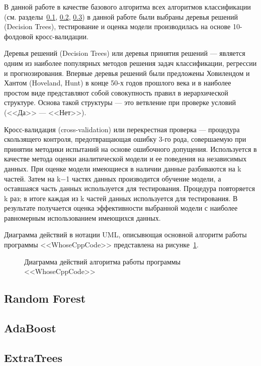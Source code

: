 В данной работе в качестве базового алгоритма всех алгоритмов классификации (см. разделы~\ref{random_forest},
\ref{ada}, \ref{extra}) в данной работе были выбраны деревья решений 
(Decision Trees), тестирование и оценка модели производилась на основе 10-фолдовой кросс-валидации.

Деревья решений (Decision Trees) или деревья принятия решений --- является одним из наиболее популярных
методов решения задач классификации, регрессии и прогнозирования. Впервые деревья решений были предложены Ховилендом и Хантом (Hoveland, Hunt) 
в конце 50-х годов прошлого века и в наиболее простом виде представляют собой совокупность правил в иерархической 
структуре. Основа такой структуры --- это ветвление при проверке условий (<<Да>> --- <<Нет>>).~\cite{data_mining} 

Кросс-валидация (cross-validation) или перекрестная проверка --- 
процедура скользящего контроля, предотвращающая ошибку 3-го рода, совершаемую 
при принятии методики испытаний на основе ошибочного допущения. Используется в качестве метода оценки
аналитической модели и ее поведения на независимых данных. При оценке модели имеющиеся в наличии 
данные разбиваются на k частей. Затем на k−1 частях данных производится обучение модели, 
а оставшаяся часть данных используется для тестирования. Процедура повторяется k раз; 
в итоге каждая из k частей данных используется для тестирования. 
В результате получается оценка эффективности выбранной модели с наиболее равномерным 
использованием имеющихся данных.~\cite{crossval}

Диаграмма действий в нотации UML, описывющая основной алгоритм работы программы <<WhoseCppCode>>
представлена на рисунке~\ref{flowchart:flowchart}.

\begin{figure}[h!]
\caption{ Диаграмма действий алгоритма работы программы <<WhoseCppCode>> }
\label{flowchart:flowchart}
\end{figure}


\subsection{Random Forest}\label{random_forest}

 

\subsection{AdaBoost}\label{ada}


\subsection{ExtraTrees}\label{extra}
